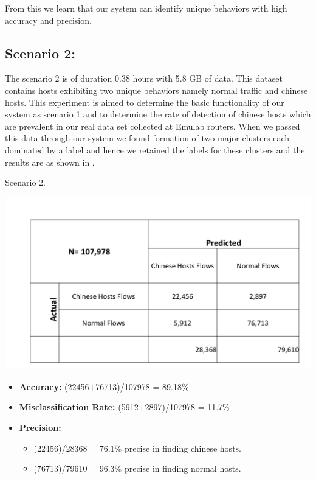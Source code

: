 From this we learn that our system can identify unique behaviors with high accuracy and precision.

\subsection{Scenario 2:}
The scenario 2 is of duration 0.38 hours with 5.8 GB of data. This dataset contains hosts exhibiting two unique behaviors namely normal traffic and chinese hosts. This experiment is aimed to determine the basic functionality of our system as scenario 1 and to determine the rate of detection of chinese hosts which are prevalent in our real data set collected at Emulab routers. When we passed this data through our system we found formation of two major clusters each dominated by a label and hence we retained the labels for these clusters and the results are as shown in .

\begin{table}[b]
	\caption{Scenario 2.}%
	\centerline{\includegraphics[scale = 0.5]{scenario2.pdf}}	
\end{table}

\begin{itemize}
	\item \textbf{Accuracy:}  (22456+76713)/107978 = 89.18\%
	
	\item \textbf{Misclassification Rate:} (5912+2897)/107978 = 11.7\%
	
	\item \textbf{Precision:} 
	\begin{itemize}	
			
		\item (22456)/28368 = 76.1\% precise in finding chinese hosts.
		
		\item (76713)/79610 = 96.3\% precise in finding normal hosts.
		
	\end{itemize}
	
\end{itemize}


